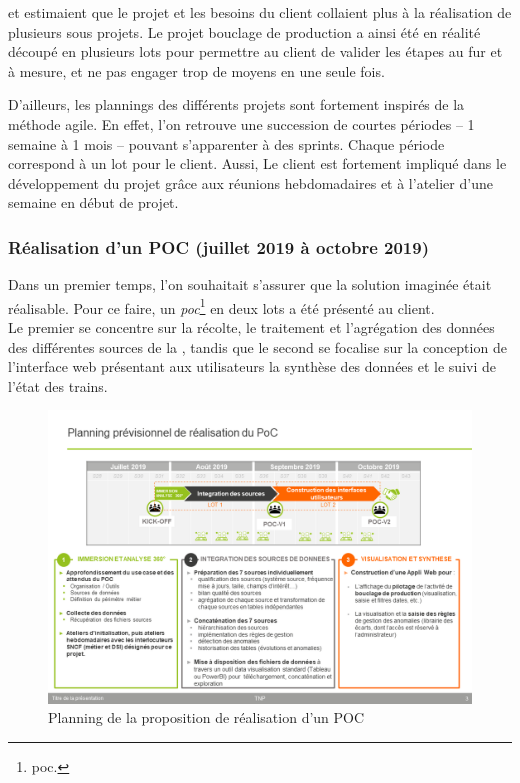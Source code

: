 \gil et \damien estimaient que le projet et les besoins du client collaient plus à la réalisation de plusieurs sous projets. Le projet \og bouclage de production \fg a ainsi été en réalité découpé en plusieurs lots pour permettre au client de valider les étapes au fur et à mesure, et ne pas engager trop de moyens en une seule fois.


D'ailleurs, les plannings des différents projets sont fortement inspirés de la méthode agile. En effet, l'on retrouve une succession de courtes périodes -- 1 semaine à 1 mois -- pouvant s'apparenter à des sprints. Chaque période correspond à un \og lot \fg pour le client. Aussi, Le client est fortement impliqué dans le développement du projet grâce aux réunions hebdomadaires et à l'atelier d'une semaine en début de projet.


\subsubsection{Réalisation d'un POC (juillet 2019 à octobre 2019)}

Dans un premier temps, l'on souhaitait s'assurer que la solution imaginée était réalisable.
Pour ce faire, un
\emph{\gls{poc}}\footnote{\glsdesc{poc}.}
en deux lots a été présenté au client.\\
Le premier se concentre sur la récolte, le traitement et l'agrégation des données des différentes sources de la \sncf,
tandis que le second se focalise sur la conception de l'interface web présentant aux utilisateurs la synthèse des données et le suivi de l'état des trains.

\begin{figure}[H]
    \centering
    \includegraphics[width=1\linewidth]{img/planning-juillet-octobre-2019.png}
    \caption{Planning de la proposition de réalisation d'un POC}
\end{figure}

